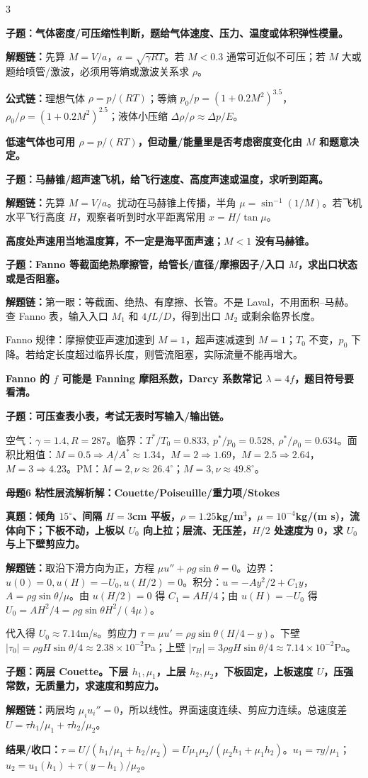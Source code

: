 \documentclass[a4paper]{article}
\newcommand{\mt}[1]{\vspace{2pt}\colorbox{M}{\parbox{\dimexpr\linewidth-2\fboxsep}{\color{white}\bfseries #1}}\par}
\newcommand{\qt}[1]{\vspace{1pt}\colorbox{Q}{\parbox{\dimexpr\linewidth-2\fboxsep}{\color{white}\bfseries #1}}\par}
\newcommand{\ans}[1]{\colorbox{G}{\parbox{\dimexpr\linewidth-2\fboxsep}{#1}}\par}
\newcommand{\warn}[1]{\colorbox{Y}{\parbox{\dimexpr\linewidth-2\fboxsep}{\color{E}\bfseries #1}}\par}
\newcommand{\chain}[1]{{\color{A}\bfseries 解题链：}#1\par}
\newcommand{\res}[1]{{\color{E}\bfseries 结果/收口：}#1\par}
\newcommand{\form}[1]{{\color{M}\bfseries 公式链：}#1\par}
\begin{document}
\begin{multicols}{3}
\qt{子题：气体密度/可压缩性判断，题给气体速度、压力、温度或体积弹性模量。}
\chain{先算 $M=V/a$，$a=\sqrt{\gamma RT}$。若 $M<0.3$ 通常可近似不可压；若 $M$ 大或题给喷管/激波，必须用等熵或激波关系求 $\rho$。}
\form{理想气体 $\rho=p/(RT)$；等熵 $p_0/p=(1+0.2M^2)^{3.5}$，$\rho_0/\rho=(1+0.2M^2)^{2.5}$；液体小压缩 $\Delta\rho/\rho\approx\Delta p/E$。}
\warn{低速气体也可用 $\rho=p/(RT)$，但动量/能量里是否考虑密度变化由 $M$ 和题意决定。}

\qt{子题：马赫锥/超声速飞机，给飞行速度、高度声速或温度，求听到距离。}
\chain{先算 $M=V/a$。扰动在马赫锥上传播，半角 $\mu=\sin^{-1}(1/M)$。若飞机水平飞行高度 $H$，观察者听到时水平距离常用 $x=H/\tan\mu$。}
\warn{高度处声速用当地温度算，不一定是海平面声速；$M<1$ 没有马赫锥。}

\qt{子题：Fanno 等截面绝热摩擦管，给管长/直径/摩擦因子/入口 $M$，求出口状态或是否阻塞。}
\chain{第一眼：等截面、绝热、有摩擦、长管。不是 Laval，不用面积--马赫。查 Fanno 表，输入入口 $M_1$ 和 $4fL/D$，得到出口 $M_2$ 或剩余临界长度。}
\ans{Fanno 规律：摩擦使亚声速加速到 $M=1$，超声速减速到 $M=1$；$T_0$ 不变，$p_0$ 下降。若给定长度超过临界长度，则管流阻塞，实际流量不能再增大。}
\warn{Fanno 的 $f$ 可能是 Fanning 摩阻系数，Darcy 系数常记 $\lambda=4f$，题目符号要看清。}

\qt{子题：可压查表小表，考试无表时写输入/输出链。}
\ans{空气：$\gamma=1.4,R=287$。临界：$T^*/T_0=0.833,\ p^*/p_0=0.528,\ \rho^*/\rho_0=0.634$。面积比粗值：$M=0.5\Rightarrow A/A^*\approx1.34$，$M=2\Rightarrow1.69$，$M=2.5\Rightarrow2.64$，$M=3\Rightarrow4.23$。PM：$M=2,\nu\approx26.4^\circ$；$M=3,\nu\approx49.8^\circ$。}

\mt{母题6 粘性层流解析解：Couette/Poiseuille/重力项/Stokes}
\qt{真题：倾角 $15^\circ$、间隔 $H=3$cm 平板，$\rho=1.25$kg/m$^3$，$\mu=10^{-4}$kg/(m s)，流体向下；下板不动，上板以 $U_0$ 向上拉；层流、无压差，$H/2$ 处速度为 0，求 $U_0$ 与上下壁剪应力。}
\chain{取沿下滑方向为正，方程 $\mu u''+\rho g\sin\theta=0$。边界：$u(0)=0,u(H)=-U_0,u(H/2)=0$。积分：$u=-Ay^2/2+C_1y$，$A=\rho g\sin\theta/\mu$。由 $u(H/2)=0$ 得 $C_1=AH/4$；由 $u(H)=-U_0$ 得 $U_0=AH^2/4=\rho g\sin\theta H^2/(4\mu)$。}
\ans{代入得 $U_0\approx7.14$m/s。剪应力 $\tau=\mu u'=\rho g\sin\theta(H/4-y)$。下壁 $|\tau_0|=\rho gH\sin\theta/4\approx2.38\times10^{-2}$Pa；上壁 $|\tau_H|=3\rho gH\sin\theta/4\approx7.14\times10^{-2}$Pa。}

\qt{子题：两层 Couette。下层 $h_1,\mu_1$，上层 $h_2,\mu_2$，下板固定，上板速度 $U$，压强常数，无质量力，求速度和剪应力。}
\chain{两层均 $\mu_i u_i''=0$，所以线性。界面速度连续、剪应力连续。总速度差 $U=\tau h_1/\mu_1+\tau h_2/\mu_2$。}
\res{$\tau=U/(h_1/\mu_1+h_2/\mu_2)=U\mu_1\mu_2/(\mu_2h_1+\mu_1h_2)$。$u_1=\tau y/\mu_1$；$u_2=u_1(h_1)+\tau(y-h_1)/\mu_2$。}


\end{multicols}
\end{document}
